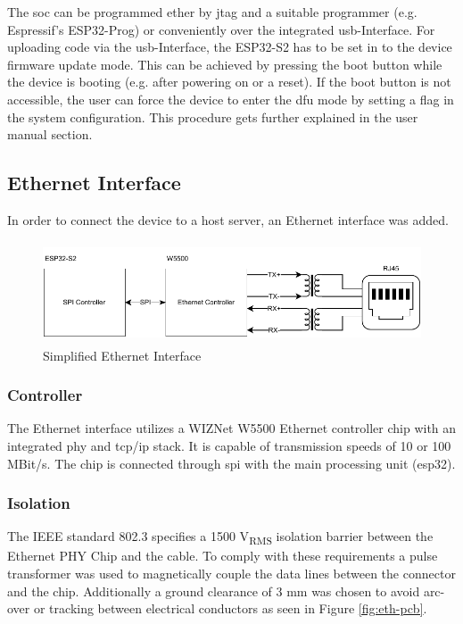 The \acrshort{soc} can be programmed ether by \acrshort{jtag} and a suitable programmer (e.g. Espressif's ESP32-Prog) or conveniently over the integrated \acrshort{usb}-Interface.\newline
For uploading code via the \acrshort{usb}-Interface, the ESP32-S2 has to be set in to the device firmware update mode. This can be achieved by pressing the boot button while the device is booting (e.g. after powering on or a reset). If the boot button is not accessible, the user can force the device to enter the \acrshort{dfu} mode by setting a flag in the system configuration. This procedure gets further explained in the user manual section.
\newpage

\subsection{Ethernet Interface}
In order to connect the device to a host server, an Ethernet interface was added.

\begin{figure}[h!]
	\centering
	\includegraphics[height=3.0cm]{images/eth_interface}
	\vspace{0.2cm}
	\caption{Simplified Ethernet Interface}
	\label{fig:eth-interface}
\end{figure}

\subsubsection{Controller}
The Ethernet interface utilizes a WIZNet W5500 Ethernet controller chip with an integrated \acrshort{phy} and \acrshort{tcp/ip} stack. It is capable of transmission speeds of 10 or 100 MBit/s. The chip is connected through \acrshort{spi} with the main processing unit (\gls{esp32}).

\subsubsection{Isolation}
The IEEE standard 802.3 specifies a 1500 V\textsubscript{RMS} isolation barrier between the Ethernet PHY Chip and the cable. To comply with these requirements a pulse transformer was used to magnetically couple the data lines between the connector and the chip. Additionally a ground clearance of 3 mm was chosen to avoid arc-over or tracking between electrical conductors as seen in Figure \ref{fig:eth-pcb}. 

